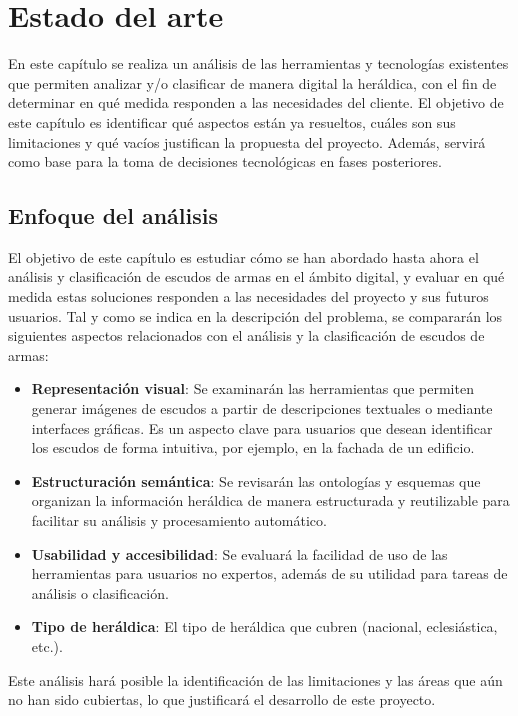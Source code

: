 \chapter{Estado del arte}

En este capítulo se realiza un análisis de las herramientas y tecnologías
existentes que permiten analizar y/o clasificar de manera digital la heráldica, con el fin
de determinar en qué medida responden a las necesidades del cliente.
El objetivo de este capítulo es identificar qué aspectos están ya resueltos,
cuáles son sus limitaciones y qué vacíos justifican la propuesta del proyecto.
Además, servirá como base para la toma de decisiones tecnológicas en fases posteriores.

\section{Enfoque del análisis}
El objetivo de este capítulo es estudiar cómo se han abordado hasta ahora el análisis y
clasificación de escudos de armas en el ámbito digital, y evaluar en qué medida estas soluciones 
responden a las necesidades del proyecto y sus futuros usuarios.
Tal y como se indica en la descripción del problema, se compararán los siguientes aspectos 
relacionados con el análisis y la clasificación de escudos de armas:

\begin{itemize}
    \item \textbf{Representación visual}: Se examinarán las herramientas que permiten
    generar imágenes de escudos a partir de descripciones textuales o mediante interfaces 
    gráficas. Es un aspecto clave para usuarios que desean identificar los escudos de
    forma intuitiva, por ejemplo, en la fachada de un edificio.
    \item \textbf{Estructuración semántica}: Se revisarán las ontologías y esquemas que
    organizan la información heráldica de manera estructurada y reutilizable para facilitar
    su análisis y procesamiento automático.
    \item \textbf{Usabilidad y accesibilidad}: Se evaluará la facilidad de uso de las herramientas
    para usuarios no expertos, además de su utilidad para tareas de análisis o clasificación.
    \item \textbf{Tipo de heráldica}: El tipo de heráldica que cubren (nacional, eclesiástica, etc.).
\end{itemize}

Este análisis hará posible la identificación de las limitaciones y las áreas que aún no han sido
cubiertas, lo que justificará el desarrollo de este proyecto.

